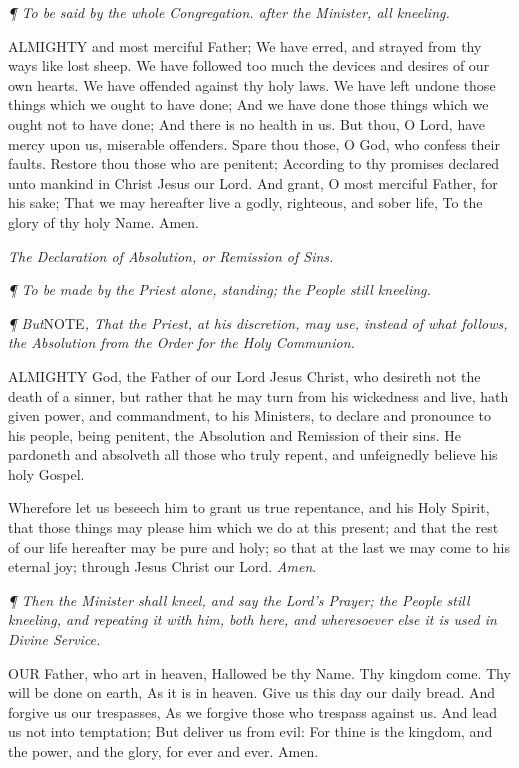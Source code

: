 \emph{¶
To be said by the whole Congregation. after the Minister, all kneeling.}

ALMIGHTY
and most merciful Father; We have erred, and strayed from thy ways like
lost sheep. We have followed too much the devices and desires of our own
hearts. We have offended against thy holy laws. We have left undone those
things which we ought to have done; And we have done those things which
we ought not to have done; And there is no health in us. But thou, O Lord,
have mercy upon us, miserable offenders. Spare thou those, O God, who
confess their faults. Restore thou those who are penitent; According to
thy promises declared unto mankind in Christ Jesus our Lord. And grant,
O most merciful Father, for his sake; That we may hereafter live a godly,
righteous, and sober life, To the glory of thy holy Name. Amen.

\emph{The Declaration of Absolution, or Remission of Sins.}

\emph{¶
To be made by the Priest alone, standing; the People still kneeling.}

\emph{¶
But}NOTE\emph{, That
the Priest, at his discretion, may use, instead of what follows, the Absolution
from the Order for the Holy Communion.}\emph{}

ALMIGHTY
God, the Father of our Lord Jesus Christ, who desireth not the death of
a sinner, but rather that he may turn from his wickedness and live, hath
given power, and commandment, to his Ministers, to declare and pronounce
to his people, being penitent, the Absolution and Remission of their sins.
He pardoneth and absolveth all those who truly repent, and unfeignedly
believe his holy Gospel.

Wherefore let us beseech him to grant us true repentance,
and his Holy Spirit, that those things may please him which we do at this
present; and that the rest of our life hereafter may be pure and holy;
so that at the last we may come to his eternal joy; through Jesus Christ
our Lord. \emph{Amen}.

\emph{¶
Then the Minister shall kneel, and say the Lord’s Prayer; the People
still kneeling, and repeating it with him, both here, and wheresoever
else it is used in Divine Service.}

OUR
Father, who art in heaven, Hallowed be thy Name. Thy kingdom come. Thy
will be done on earth, As it is in heaven. Give us this day our daily
bread. And forgive us our trespasses, As we forgive those who trespass
against us. And lead us not into temptation; But deliver us from evil:
For thine is the kingdom, and the power, and the glory, for ever and ever.
Amen.

